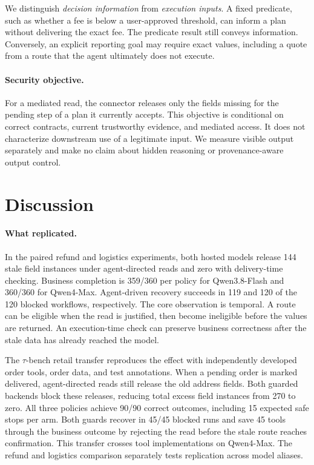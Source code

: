 \documentclass[10pt,twocolumn]{article}
\begin{document}
We distinguish \emph{decision information} from \emph{execution inputs}. A fixed predicate, such as whether a fee is below a user-approved threshold, can inform a plan without delivering the exact fee. The predicate result still conveys information. Conversely, an explicit reporting goal may require exact values, including a quote from a route that the agent ultimately does not execute.

\paragraph{Security objective.}
For a mediated read, the connector releases only the fields missing for the pending step of a plan it currently accepts. This objective is conditional on correct contracts, current trustworthy evidence, and mediated access. It does not characterize downstream use of a legitimate input. We measure visible output separately and make no claim about hidden reasoning or provenance-aware output control.





\section{Discussion}
\paragraph{What replicated.}
In the paired refund and logistics experiments, both hosted models release 144 stale field instances under agent-directed reads and zero with delivery-time checking. Business completion is 359/360 per policy for Qwen3.8-Flash and 360/360 for Qwen4-Max. Agent-driven recovery succeeds in 119 and 120 of the 120 blocked workflows, respectively. The core observation is temporal. A route can be eligible when the read is justified, then become ineligible before the values are returned. An execution-time check can preserve business correctness after the stale data has already reached the model.

The $\tau$-bench retail transfer reproduces the effect with independently developed order tools, order data, and test annotations. When a pending order is marked delivered, agent-directed reads still release the old address fields. Both guarded backends block these releases, reducing total excess field instances from 270 to zero. All three policies achieve 90/90 correct outcomes, including 15 expected safe stops per arm. Both guards recover in 45/45 blocked runs and save 45 tools through the business outcome by rejecting the read before the stale route reaches confirmation. This transfer crosses tool implementations on Qwen4-Max. The refund and logistics comparison separately tests replication across model aliases.
\end{document}

